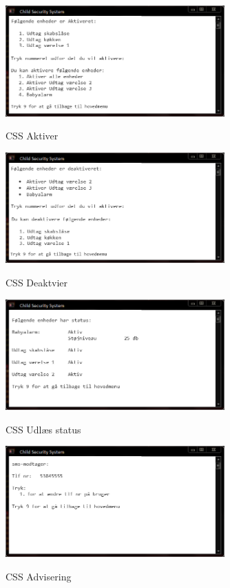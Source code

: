 \begin{figure}[H] \centering
{\includegraphics[width=0.75\textwidth]{billeder/cmdprompt/CSS_aktiver}}
\caption{CSS Aktiver}
\end{figure}

\begin{figure}[H] \centering
{\includegraphics[width=0.75\textwidth]{billeder/cmdprompt/CSS_deaktiver}}
\caption{CSS Deaktvier}
\end{figure}

\begin{figure}[H] \centering
{\includegraphics[width=0.75\textwidth]{billeder/cmdprompt/CSS_vis_status}}
\caption{CSS Udlæs status}
\end{figure}

\begin{figure}[H] \centering
{\includegraphics[width=0.75\textwidth]{billeder/cmdprompt/CSS_advisering}}
\caption{CSS Advisering}
\end{figure}

